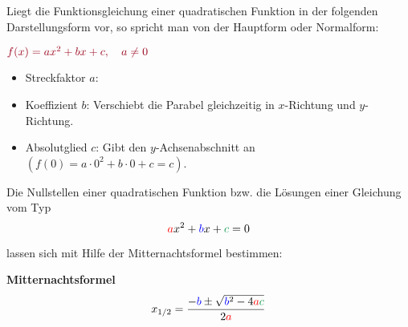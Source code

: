 Liegt die Funktionsgleichung einer quadratischen Funktion in der folgenden Darstellungsform vor, so spricht man von der Hauptform oder Normalform:
\begin{tcolorbox}\centering
	\(\textcolor{loestc}{f(x)=ax^2+bx+c, \quad a\neq 0}\)
\end{tcolorbox}

\begin{itemize}
    \setlength{\qrheight}{2.5cm}%
	\item Streckfaktor \(a\):

    \bigskip

	\item Koeffizient \(b\): \textcolor{loes}{Verschiebt die Parabel gleichzeitig in \(x\)-Richtung und \(y\)-Richtung.}

	\bigskip

	\item Absolutglied \(c\): \textcolor{loes}{Gibt den \(y\)-Achsenabschnitt an \(\left(f(0)=a\cdot 0^2+b\cdot 0+c=c\right)\).}

	\bigskip

\end{itemize}
Die Nullstellen einer quadratischen Funktion bzw. die Lösungen einer Gleichung vom Typ
\[{\textcolor{red}{a}x^2+\textcolor{blue}{b}x+\textcolor{ForestGreen}{c}=0}\]%

lassen sich mit Hilfe der Mitternachtsformel bestimmen:
\begin{tcolorbox}
\textbf{Mitternachtsformel}
\[x_{1/2}=\frac{-\textcolor{blue}{b}\pm\sqrt{\textcolor{blue}{b}^2-4 \textcolor{red}{a}  \textcolor{ForestGreen}{c}}}{2 \textcolor{red}{a}}\]%
\end{tcolorbox}

